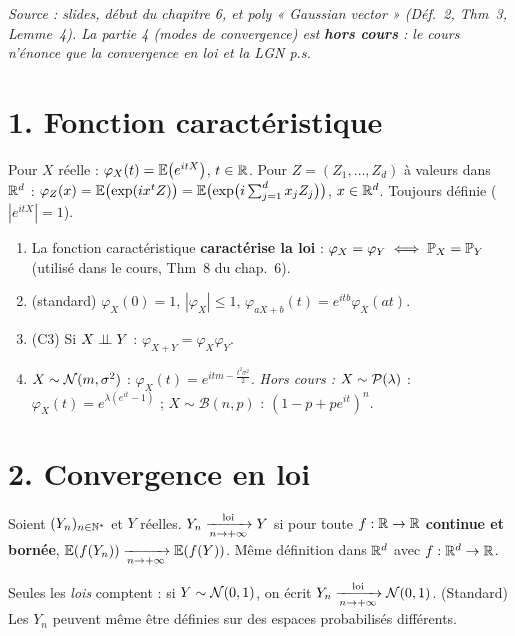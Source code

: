 \documentclass[11pt,a4paper]{article}
\begin{document}

\textit{Source : slides, début du chapitre 6, et poly « Gaussian vector » (Déf.~2, Thm~3, Lemme~4).
La partie 4 (modes de convergence) est \textbf{hors cours} : le cours n'énonce que la convergence en loi et la LGN p.s.}

\section*{1. Fonction caractéristique}

\begin{definition}\label{C4:fc}
Pour $X$ réelle : $\varphi_X(t)=\mathbb{E}\bigl(e^{itX}\bigr)$, $t\in\mathbb{R}$. Pour $Z=(Z_1,\dots,Z_d)$ à valeurs dans $\mathbb{R}^d$ :
$\varphi_Z(x)=\mathbb{E}\bigl(\exp(ix^tZ)\bigr)=\mathbb{E}\bigl(\exp\bigl(i\sum_{j=1}^dx_jZ_j\bigr)\bigr)$, $x\in\mathbb{R}^d$.
Toujours définie ($|e^{itX}|=1$).
\end{definition}

\begin{proposition}[propriétés]\label{C4:fc-prop}\leavevmode
\begin{enumerate}
  \item La fonction caractéristique \textbf{caractérise la loi} : $\varphi_X=\varphi_Y\iff\mathbb{P}_X=\mathbb{P}_Y$ (utilisé dans le cours, Thm~8 du chap.~6).
  \item (standard) $\varphi_X(0)=1$, $|\varphi_X|\le1$, $\varphi_{aX+b}(t)=e^{itb}\varphi_X(at)$.
  \item (C3) Si $X\perp\!\!\!\perp Y$ : $\varphi_{X+Y}=\varphi_X\varphi_Y$.
  \item $X\sim\mathcal{N}(m,\sigma^2)$ : $\varphi_X(t)=e^{itm-\frac{t^2\sigma^2}{2}}$.
  \quad\emph{Hors cours :} $X\sim\mathcal{P}(\lambda)$ : $\varphi_X(t)=e^{\lambda(e^{it}-1)}$ ; $X\sim\mathcal B(n,p)$ : $(1-p+pe^{it})^n$.
\end{enumerate}
\end{proposition}

\section*{2. Convergence en loi}

\begin{definition}\label{C4:loi}
Soient $(Y_n)_{n\in\mathbb{N}^*}$ et $Y$ réelles. $Y_n\xrightarrow[n\to+\infty]{\text{loi}} Y$ si pour toute $f:\mathbb{R}\to\mathbb{R}$ \textbf{continue et bornée},
$\mathbb{E}(f(Y_n))\xrightarrow[n\to+\infty]{}\mathbb{E}(f(Y))$. Même définition dans $\mathbb{R}^d$ avec $f:\mathbb{R}^d\to\mathbb{R}$.
\end{definition}
\begin{remarque}
Seules les \emph{lois} comptent : si $Y\sim\mathcal{N}(0,1)$, on écrit $Y_n\xrightarrow[n\to+\infty]{\text{loi}}\mathcal{N}(0,1)$. (Standard) Les $Y_n$ peuvent même être définies sur
des espaces probabilisés différents.
\end{remarque}
\end{document}
